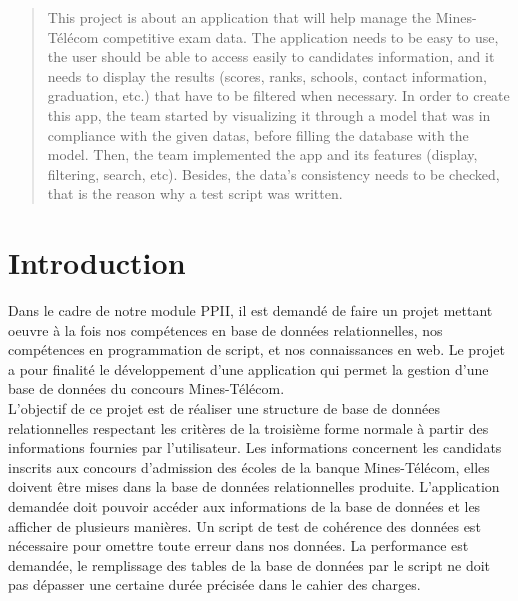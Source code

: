 \documentclass[12pt]{article}
\begin{document}
\renewcommand{\abstractname}{Abstract}

\begin{abstract}
This project is about an application that will help manage the Mines-Télécom competitive exam data. The application needs to be easy to use, the user should be able to access easily to candidates information, and it needs to display the results (scores, ranks, schools, contact information, graduation, etc.) that have to be filtered when necessary. In order to create this app, the team started by visualizing it through a model that was in compliance with the given datas, before filling the database with the model. Then, the team implemented the app and its features (display, filtering, search, etc). Besides, the data’s consistency needs to be checked, that is the reason why a test script was written.
\end{abstract}

\newpage

\tableofcontents

\newpage

\section*{Introduction} 
    
Dans le cadre de notre module PPII, il est demandé de faire un projet mettant oeuvre à la fois nos compétences en base de données relationnelles, nos compétences en programmation de script, et nos connaissances en web. Le projet a pour finalité le développement d'une application qui permet la gestion d'une base de données du concours Mines-Télécom. \\
    
    L'objectif de ce projet est de réaliser une structure de base de données relationnelles respectant les critères de la troisième forme normale à partir des informations fournies par l'utilisateur. Les informations concernent les candidats inscrits aux concours d'admission des écoles de la banque Mines-Télécom, elles doivent être mises dans la base de données relationnelles produite. L'application demandée doit pouvoir accéder aux informations de la base de données et les afficher de plusieurs manières. Un script de test de cohérence des données est nécessaire pour omettre toute erreur dans nos données. La performance est demandée, le remplissage des tables de la base de données par le script ne doit pas dépasser une certaine durée précisée dans le cahier des charges.\\
    
\end{document}
